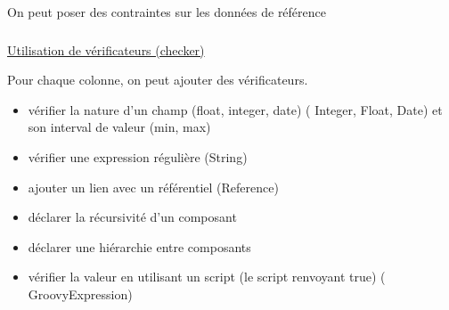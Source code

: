 \documentclass[
  letterpaper,
  DIV=11,
  numbers=noendperiod]{scrartcl}
\author{}
\date{}
\makeatletter
\let\oldparagraph\paragraph
\renewcommand{\paragraph}{
    \@ifstar
      \xxxParagraphStar
      \xxxParagraphNoStar
  }
\newcommand{\xxxParagraphStar}[1]{\oldparagraph*{#1}\mbox{}}
\newcommand{\xxxParagraphNoStar}[1]{\oldparagraph{#1}\mbox{}}
\let\oldsubparagraph\subparagraph
\renewcommand{\subparagraph}{
    \@ifstar
      \xxxSubParagraphStar
      \xxxSubParagraphNoStar
  }
\newcommand{\xxxSubParagraphStar}[1]{\oldsubparagraph*{#1}\mbox{}}
\newcommand{\xxxSubParagraphNoStar}[1]{\oldsubparagraph{#1}\mbox{}}
\providecommand{\tightlist}{%
  \setlength{\itemsep}{0pt}\setlength{\parskip}{0pt}}\usepackage{longtable,booktabs,array}
\makeatother
\begin{document}
\paragraph{On peut poser des contraintes sur les données de
référence}\label{on-peut-poser-des-contraintes-sur-les-donnuxe9es-de-ruxe9fuxe9rence}

\subparagraph{\texorpdfstring{\hyperref[dataChecker]{Utilisation de
vérificateurs
(checker)}}{Utilisation de vérificateurs (checker)}}\label{utilisation-de-vuxe9rificateurs-checker}

Pour chaque colonne, on peut ajouter des vérificateurs.

\begin{itemize}
\tightlist
\item
  vérifier la nature d'un champ (float, integer, date) ( Integer, Float,
  Date) et son interval de valeur (min, max)
\item
  vérifier une expression régulière (String)
\item
  ajouter un lien avec un référentiel (Reference)
\item
  déclarer la récursivité d'un composant
\item
  déclarer une hiérarchie entre composants
\item
  vérifier la valeur en utilisant un script (le script renvoyant true) (
  GroovyExpression)
\end{itemize}
\end{document}
